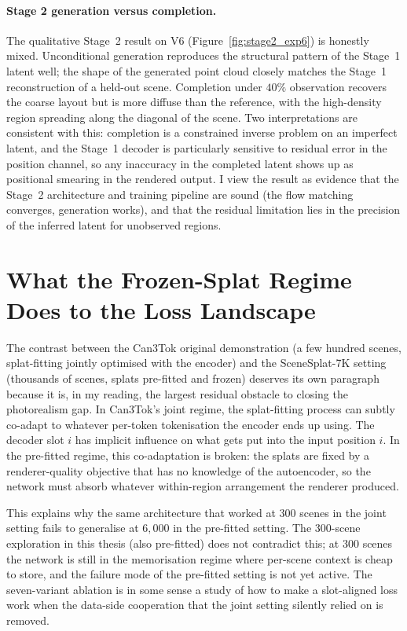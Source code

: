 \paragraph{Stage 2 generation versus completion.} The qualitative Stage~2 result on V6 (Figure~\ref{fig:stage2_exp6}) is honestly mixed. Unconditional generation reproduces the structural pattern of the Stage~1 latent well; the shape of the generated point cloud closely matches the Stage~1 reconstruction of a held-out scene. Completion under $40\%$ observation recovers the coarse layout but is more diffuse than the reference, with the high-density region spreading along the diagonal of the scene. Two interpretations are consistent with this: completion is a constrained inverse problem on an imperfect latent, and the Stage~1 decoder is particularly sensitive to residual error in the position channel, so any inaccuracy in the completed latent shows up as positional smearing in the rendered output. I view the result as evidence that the Stage~2 architecture and training pipeline are sound (the flow matching converges, generation works), and that the residual limitation lies in the precision of the inferred latent for unobserved regions.

\section{What the Frozen-Splat Regime Does to the Loss Landscape}
\label{sec:disc_frozen}

The contrast between the Can3Tok original demonstration (a few hundred scenes, splat-fitting jointly optimised with the encoder) and the SceneSplat-7K setting (thousands of scenes, splats pre-fitted and frozen) deserves its own paragraph because it is, in my reading, the largest residual obstacle to closing the photorealism gap. In Can3Tok's joint regime, the splat-fitting process can subtly co-adapt to whatever per-token tokenisation the encoder ends up using. The decoder slot $i$ has implicit influence on what gets put into the input position $i$. In the pre-fitted regime, this co-adaptation is broken: the splats are fixed by a renderer-quality objective that has no knowledge of the autoencoder, so the network must absorb whatever within-region arrangement the renderer produced.

This explains why the same architecture that worked at $300$ scenes in the joint setting fails to generalise at $6{,}000$ in the pre-fitted setting. The 300-scene exploration in this thesis (also pre-fitted) does not contradict this; at 300 scenes the network is still in the memorisation regime where per-scene context is cheap to store, and the failure mode of the pre-fitted setting is not yet active. The seven-variant ablation is in some sense a study of how to make a slot-aligned loss work when the data-side cooperation that the joint setting silently relied on is removed.

